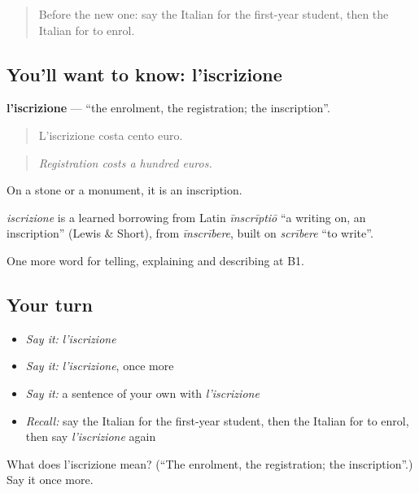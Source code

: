 \begin{quote}
Before the new one: say the Italian for the first-year student, then the Italian for to enrol.
\end{quote}

\subsection*{You'll want to know: l'iscrizione}
\textbf{l'iscrizione} — \textquotedblleft{}the enrolment, the registration; the inscription\textquotedblright{}.

\begin{quote}
L'iscrizione costa cento euro.
\end{quote}

\begin{quote}
\emph{Registration costs a hundred euros.}
\end{quote}

On a stone or a monument, it is an inscription.

\begin{cousinweb}
\emph{iscrizione} is a learned borrowing from Latin \emph{īnscrīptiō} \textquotedblleft{}a writing on, an inscription\textquotedblright{} (Lewis \& Short), from \emph{īnscrībere}, built on \emph{scrībere} \textquotedblleft{}to write\textquotedblright{}.
\end{cousinweb}

\begin{grammarlens}[title={What you've built}]
One more word for telling, explaining and describing at B1.
\end{grammarlens}

\subsection*{Your turn}
\begin{itemize}
\raggedright
  \item \emph{Say it:} \emph{l'iscrizione}
  \item \emph{Say it:} \emph{l'iscrizione}, once more
  \item \emph{Say it:} a sentence of your own with \emph{l'iscrizione}
  \item \emph{Recall:} say the Italian for the first-year student, then the Italian for to enrol, then say \emph{l'iscrizione} again
\end{itemize}

\begin{tcolorbox}[breakable,colback=teal!4,colframe=teal!35!black,title={Before you move on}]
What does l'iscrizione mean? (\textquotedblleft{}The enrolment, the registration; the inscription\textquotedblright{}.) Say it once more.
\end{tcolorbox}
